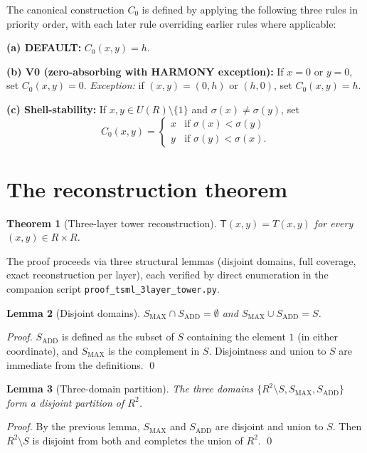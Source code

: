 \documentclass[11pt,reqno]{amsart}
\theoremstyle{plain}
\newtheorem{theorem}{Theorem}
\newtheorem{lemma}[theorem]{Lemma}
\theoremstyle{definition}
\begin{document}
The canonical construction $C_0$ is defined by applying the following
three rules in priority order, with each later rule overriding earlier
rules where applicable:

\textbf{(a) DEFAULT:} $C_0(x, y) = h$.

\textbf{(b) V0 (zero-absorbing with HARMONY exception):} If $x = 0$
or $y = 0$, set $C_0(x, y) = 0$. \emph{Exception:} if
$(x, y) = (0, h)$ or $(h, 0)$, set $C_0(x, y) = h$.

\textbf{(c) Shell-stability:} If $x, y \in U(R) \setminus \{1\}$
and $\sigma(x) \neq \sigma(y)$, set
\[
C_0(x, y) = \begin{cases}
x & \text{if } \sigma(x) < \sigma(y) \\
y & \text{if } \sigma(y) < \sigma(x).
\end{cases}
\]

\section{The reconstruction theorem}

\begin{theorem}[Three-layer tower reconstruction]\label{thm:main}
$\mathsf{T}(x, y) = T(x, y)$ for every $(x, y) \in R \times R$.
\end{theorem}

The proof proceeds via three structural lemmas (disjoint domains,
full coverage, exact reconstruction per layer), each verified by
direct enumeration in the companion script
\texttt{proof\_tsml\_3layer\_tower.py}.

\begin{lemma}[Disjoint domains]
$S_{\mathrm{MAX}} \cap S_{\mathrm{ADD}} = \emptyset$ and
$S_{\mathrm{MAX}} \cup S_{\mathrm{ADD}} = S$.
\end{lemma}
\begin{proof}
$S_{\mathrm{ADD}}$ is defined as the subset of $S$ containing the
element $1$ (in either coordinate), and $S_{\mathrm{MAX}}$ is the
complement in $S$. Disjointness and union to $S$ are immediate from
the definitions. \qed
\end{proof}

\begin{lemma}[Three-domain partition]\label{lem:partition}
The three domains $\{R^2 \setminus S, S_{\mathrm{MAX}},
S_{\mathrm{ADD}}\}$ form a disjoint partition of $R^2$.
\end{lemma}
\begin{proof}
By the previous lemma, $S_{\mathrm{MAX}}$ and $S_{\mathrm{ADD}}$
are disjoint and union to $S$. Then $R^2 \setminus S$ is disjoint
from both and completes the union of $R^2$. \qed
\end{proof}
\end{document}
